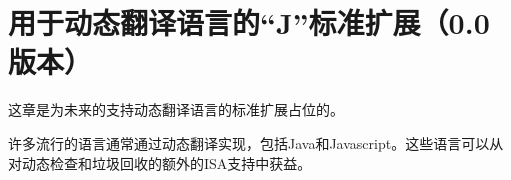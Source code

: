 \chapter{用于动态翻译语言的“J”标准扩展（0.0版本）}
\label{sec:j}

这章是为未来的支持动态翻译语言的标准扩展占位的。

\begin{commentary}
  许多流行的语言通常通过动态翻译实现，包括Java和Javascript。这些语言可以从对动态检查和垃圾回收的额外的ISA支持中获益。
\end{commentary}

